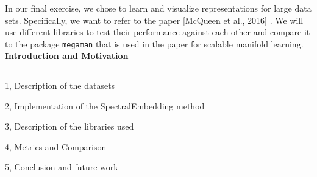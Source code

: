 \documentclass[10pt,a4paper]{article}
\begin{document}
\frontpage

In our final exercise, we chose to learn and visualize representations for large data sets. Specifically, we want to refer to the paper [McQueen et al., 2016] \cite{megaman}. 
We will use different libraries to test their performance against each other and compare it to the package \texttt{megaman} that is used in the paper for scalable manifold learning. %
\\

\textbf{Introduction and Motivation}
\vspace{5pt}
\hrule
\vspace{5pt}


\begin{task}{1, Description of the datasets}

\end{task}

\begin{task}{2, Implementation of the SpectralEmbedding method}

\end{task}

\begin{task}{3, Description of the libraries used}

\end{task}

\newpage
\begin{task}{4, Metrics and Comparison}

\end{task}

\begin{task}{5, Conclusion and future work}

\end{task}



\end{document}
